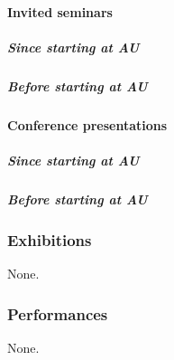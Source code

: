 \paragraph{Invited seminars}
\subparagraph{Since starting at AU}
\nocite{*}
\printbibliography[filter=auinvitedpresentation, heading=none]

\subparagraph{Before starting at AU}
\nocite{*}
\printbibliography[filter=beforeauinvitedpresentation, heading=none]

\paragraph{Conference presentations}
\subparagraph{Since starting at AU}
\nocite{*}
\printbibliography[filter=aupresentation, heading=none]

\subparagraph{Before starting at AU}
\nocite{*}
\printbibliography[filter=beforeaupresentation, heading=none]





\subsubsection{Exhibitions}
None.

\subsubsection{Performances}
None.

